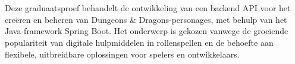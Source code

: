 
%
%
%
%
%

%



\chapter*{}

Deze graduaatsproef behandelt de ontwikkeling van een backend API voor het creëren en beheren van Dungeons \& Dragons-personages, met behulp van het Java-framework Spring Boot. Het onderwerp is gekozen vanwege de groeiende populariteit van digitale hulpmiddelen in rollenspellen en de behoefte aan flexibele, uitbreidbare oplossingen voor spelers en ontwikkelaars.


